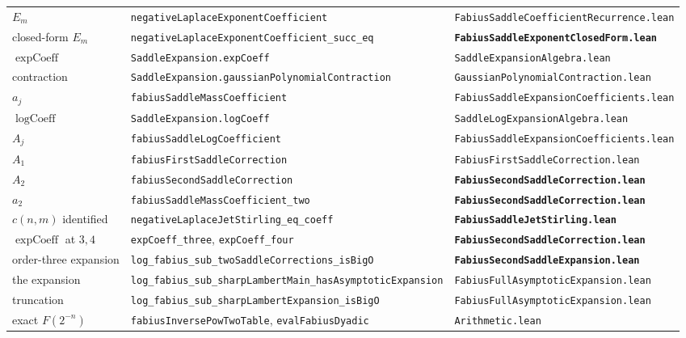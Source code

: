 \documentclass[11pt,oneside]{article}
\theoremstyle{definition}
\theoremstyle{remark}
\begin{document}
\begin{longtable}{@{}>{\raggedright\arraybackslash}p{}>{\raggedright\arraybackslash}p{}>{\raggedright\arraybackslash}p{}@{}}
$E_m$ & \nolinkurl{negativeLaplaceExponentCoefficient} & \nolinkurl{FabiusSaddleCoefficientRecurrence.lean}\\
closed-form $E_m$ & \nolinkurl{negativeLaplaceExponentCoefficient_succ_eq} & \textbf{\nolinkurl{FabiusSaddleExponentClosedForm.lean}}\\
$\operatorname{expCoeff}$ & \nolinkurl{SaddleExpansion.expCoeff} & \nolinkurl{SaddleExpansionAlgebra.lean}\\
contraction & \nolinkurl{SaddleExpansion.gaussianPolynomialContraction} & \nolinkurl{GaussianPolynomialContraction.lean}\\
$a_j$ & \nolinkurl{fabiusSaddleMassCoefficient} & \nolinkurl{FabiusSaddleExpansionCoefficients.lean}\\
$\operatorname{logCoeff}$ & \nolinkurl{SaddleExpansion.logCoeff} & \nolinkurl{SaddleLogExpansionAlgebra.lean}\\
$A_j$ & \nolinkurl{fabiusSaddleLogCoefficient} & \nolinkurl{FabiusSaddleExpansionCoefficients.lean}\\
$A_1$ & \nolinkurl{fabiusFirstSaddleCorrection} & \nolinkurl{FabiusFirstSaddleCorrection.lean}\\
$A_2$ & \nolinkurl{fabiusSecondSaddleCorrection} & \textbf{\nolinkurl{FabiusSecondSaddleCorrection.lean}}\\
$a_2$ & \nolinkurl{fabiusSaddleMassCoefficient_two} & \textbf{\nolinkurl{FabiusSecondSaddleCorrection.lean}}\\
$c(n,m)$ identified & \nolinkurl{negativeLaplaceJetStirling_eq_coeff} & \textbf{\nolinkurl{FabiusSaddleJetStirling.lean}}\\
$\operatorname{expCoeff}$ at $3,4$ & \nolinkurl{expCoeff_three}, \nolinkurl{expCoeff_four} & \textbf{\nolinkurl{FabiusSecondSaddleCorrection.lean}}\\
order-three expansion & \nolinkurl{log_fabius_sub_twoSaddleCorrections_isBigO} & \textbf{\nolinkurl{FabiusSecondSaddleExpansion.lean}}\\
the expansion & \nolinkurl{log_fabius_sub_sharpLambertMain_hasAsymptoticExpansion} & \nolinkurl{FabiusFullAsymptoticExpansion.lean}\\
truncation & \nolinkurl{log_fabius_sub_sharpLambertExpansion_isBigO} & \nolinkurl{FabiusFullAsymptoticExpansion.lean}\\
exact $F(2^{-n})$ & \nolinkurl{fabiusInversePowTwoTable}, \nolinkurl{evalFabiusDyadic} & \nolinkurl{Arithmetic.lean}\\
\bottomrule
\end{longtable}
\endgroup
\end{document}
